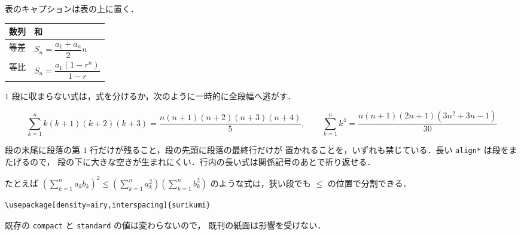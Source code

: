 \documentclass[lualatex,paper=b5j,fontsize=10pt,twoside]{jlreq}
\begin{document}
表のキャプションは表の上に置く．

\begin{center}
  \fontsize{7}{9}\selectfont
  \begin{tabular}{@{}ll@{}}
    \hline
    数列 & 和 \\
    \hline
    等差 & $S_n=\dfrac{a_1+a_n}{2}n$ \\[.6em]
    等比 & $S_n=\dfrac{a_1(1-r^n)}{1-r}$ \\
    \hline
  \end{tabular}
\end{center}


$1$ 段に収まらない式は，式を分けるか，次のように一時的に全段幅へ逃がす．

\begin{mmwideblock}
  \[
    \sum_{k=1}^{n}k(k+1)(k+2)(k+3)
      =\dfrac{n(n+1)(n+2)(n+3)(n+4)}{5},\qquad
    \sum_{k=1}^{n}k^4=\dfrac{n(n+1)(2n+1)(3n^2+3n-1)}{30}
  \]
\end{mmwideblock}



段の末尾に段落の第 $1$ 行だけが残ること，段の先頭に段落の最終行だけが
置かれることを，いずれも禁じている．長い \verb|align*| は段をまたげるので，
段の下に大きな空きが生まれにくい．行内の長い式は関係記号のあとで折り返せる．

たとえば $\left(\sum_{k=1}^{n}a_kb_k\right)^2\leq
\left(\sum_{k=1}^{n}a_k^2\right)\left(\sum_{k=1}^{n}b_k^2\right)$
のような式は，狭い段でも $\leq$ の位置で分割できる．




\begin{verbatim}
\usepackage[density=airy,interspacing]{surikumi}
\end{verbatim}

既存の \texttt{compact} と \texttt{standard} の値は変わらないので，
既刊の紙面は影響を受けない．
\end{document}
